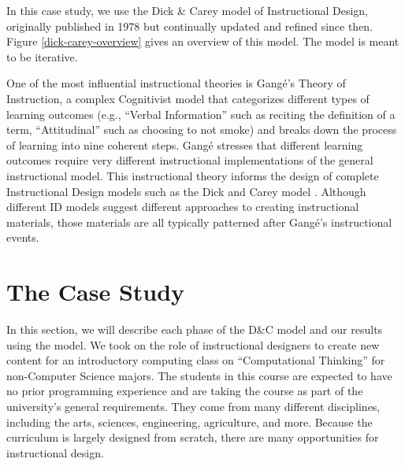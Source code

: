\documentclass{acm_proc_article-sp}
\begin{document}
In this case study, we use the Dick \& Carey model of Instructional Design, originally published in 1978 but continually updated and refined since then.
Figure \ref{dick-carey-overview} gives an overview of this model.
The model is meant to be iterative.



One of the most influential\cite{anglin1992reference} instructional theories is Gang\'{e}'s Theory of Instruction, a complex Cognitivist model that categorizes different types of learning outcomes (e.g., ``Verbal Information'' such as reciting the definition of a term, ``Attitudinal'' such as choosing to not smoke) and breaks down the process of learning into nine coherent steps. Gang\'{e} stresses that different learning outcomes require very different instructional implementations of the general instructional model. This instructional theory informs the design of complete Instructional Design models such as the Dick and Carey model \cite{carey2001systematic}. Although different ID models suggest different approaches to creating instructional materials, those materials are all typically patterned after Gang\'{e}'s instructional events.

\section{The Case Study}

In this section, we will describe each phase of the D\&C model and our results using the model.
We took on the role of instructional designers to create new content for an introductory computing class on ``Computational Thinking'' for non-Computer Science majors.
The students in this course are expected to have no prior programming experience and are taking the course as part of the university's general requirements.
They come from many different disciplines, including the arts, sciences, engineering, agriculture, and more.
Because the curriculum is largely designed from scratch, there are many opportunities for instructional design.
\end{document}
